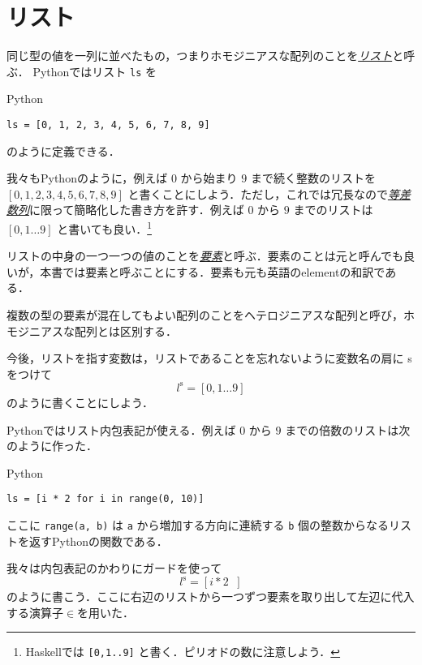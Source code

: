 \documentclass[a4paper,draft]{jsbook}
\newcommand{\programminglanguage}[1]{\textsf{#1}}
\newcommand{\haskell}{\programminglanguage{Haskell}}
\newcommand{\python}{\programminglanguage{Python}}
\newcommand{\keyword}[1]{{\underline{\emph{#1}}}}
\newcommand{\code}[1]{\texttt{#1}}
\newenvironment{pythoncode}{\begin{itembox}[r]{\python}}{\end{itembox}}
\newcommand{\mListOf}[1]{\left[#1\right]}
\newcommand{\mListVar}[1]{{#1}^\mathrm{s}}
\newcommand{\mGuard}[1]{\mathop{\mid_{#1}}}
\DeclareMathOperator{\mFrom}{\in}
\begin{document}
\section{リスト}

同じ型の値を一列に並べたもの，つまりホモジニアスな配列のことを\keyword{リスト}と呼ぶ．
\python ではリスト \code{ls} を
\begin{pythoncode}
\begin{verbatim}
ls = [0, 1, 2, 3, 4, 5, 6, 7, 8, 9]
\end{verbatim}
\end{pythoncode}
のように定義できる．

我々も\python のように，例えば $0$ から始まり $9$ まで続く整数のリストを $[0,1,2,3,4,5,6,7,8,9]$ と書くことにしよう．ただし，これでは冗長なので\keyword{等差数列}に限って簡略化した書き方を許す．例えば $0$ から $9$ までのリストは $\mListOf{0,1\dots9}$ と書いても良い．\footnote{\haskell では \code{[0,1..9]} と書く．ピリオドの数に注意しよう．}

リストの中身の一つ一つの値のことを\keyword{要素}と呼ぶ．要素のことは元と呼んでも良いが，本書では要素と呼ぶことにする．要素も元も英語のelementの和訳である．

複数の型の要素が混在してもよい配列のことをヘテロジニアスな配列と呼び，ホモジニアスな配列とは区別する．

今後，リストを指す変数は，リストであることを忘れないように変数名の肩に s をつけて
\begin{equation}
\mListVar{l}=\mListOf{0,1\dots9}
\end{equation}
のように書くことにしよう．

\python ではリスト内包表記が使える．例えば $0$ から $9$ までの倍数のリストは次のように作った．
\begin{pythoncode}
\begin{verbatim}
ls = [i * 2 for i in range(0, 10)]
\end{verbatim}
\end{pythoncode}
ここに \code{range(a, b)} は \code{a} から増加する方向に連続する \code{b} 個の整数からなるリストを返す\python の関数である．

我々は内包表記のかわりにガードを使って
\begin{equation}
\mListVar{l}=\mListOf{i*2\mGuard{i\mFrom{\mListOf{0,1\dots9}}}}
\end{equation}
のように書こう．ここに右辺のリストから一つずつ要素を取り出して左辺に代入する演算子$\mFrom$を用いた．
\end{document}
